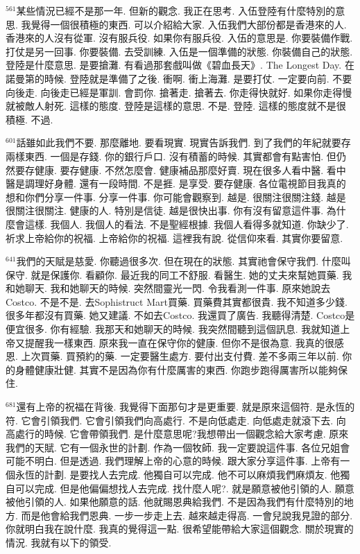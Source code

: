 \documentclass{book}
\begin{document}
$^{561}$某些情況已經不是那一年.
但新的觀念.
我正在思考.
入伍登陸有什麼特別的意思.
我覺得一個很積極的東西.
可以介紹給大家.
入伍我們大部份都是香港來的人.
香港來的人沒有從軍.
沒有服兵役.
如果你有服兵役.
入伍的意思是.
你要裝備作戰.
打仗是另一回事.
你要裝備.
去受訓練.
入伍是一個準備的狀態.
你裝備自己的狀態.
登陸是什麼意思.
是要搶灘.
有看過那套戲叫做《碧血長天》.
The Longest Day.
在諾曼第的時候.
登陸就是準備了之後.
衝啊.
衝上海灘.
是要打仗.
一定要向前.
不要向後走.
向後走已經是軍訓.
會罰你.
搶著走.
搶著去.
你走得快就好.
如果你走得慢就被敵人射死.
這樣的態度.
登陸是這樣的意思.
不是.
登陸.
這樣的態度就不是很積極.
不過.

$^{601}$話雖如此我們不要.
那麼離地.
要看現實.
現實告訴我們.
到了我們的年紀就要存兩樣東西.
一個是存錢.
你的銀行戶口.
沒有積蓄的時候.
其實都會有點害怕.
但仍然要存健康.
要存健康.
不然怎麼會.
健康補品那麼好賣.
現在很多人看中醫.
看中醫是調理好身體.
還有一段時間.
不是捱.
是享受.
要存健康.
各位電視節目我真的想和你們分享一件事.
分享一件事.
你可能會觀察到.
越是.
很關注很關注錢.
越是很關注很關注.
健康的人.
特別是信徒.
越是很快出事.
你有沒有留意這件事.
為什麼會這樣.
我個人.
我個人的看法.
不是聖經根據.
我個人看得多就知道.
你缺少了.
祈求上帝給你的祝福.
上帝給你的祝福.
這裡我有說.
從信仰來看.
其實你要留意.

$^{641}$我們的天賦是慈愛.
你聽過很多次.
但在現在的狀態.
其實祂會保守我們.
什麼叫保守.
就是保護你.
看顧你.
最近我的同工不舒服.
看醫生.
她的丈夫來幫她買藥.
我和她聊天.
我和她聊天的時候.
突然間靈光一閃.
令我看測一件事.
原來她說去Costco.
不是不是.
去Sophistruct Mart買藥.
買藥費其實都很貴.
我不知道多少錢.
很多年都沒有買藥.
她又建議.
不如去Costco.
我還買了廣告.
我聽得清楚.
Costco是便宜很多.
你有經驗.
我那天和她聊天的時候.
我突然間聽到這個訊息.
我就知道上帝又提醒我一樣東西.
原來我一直在保守你的健康.
但你不是很為意.
我真的很感恩.
上次買藥.
買預約的藥.
一定要醫生處方.
要付出支付費.
差不多兩三年以前.
你的身體健康壯健.
其實不是因為你有什麼厲害的東西.
你跑步跑得厲害所以能夠保住.

$^{681}$還有上帝的祝福在背後.
我覺得下面那句才是更重要.
就是原來這個符.
是永恆的符.
它會引領我們.
它會引領我們向高處行.
不是向低處走.
向低處走就滾下去.
向高處行的時候.
它會帶領我們.
是什麼意思呢?我想帶出一個觀念給大家考慮.
原來我們的天賦.
它有一個永世的計劃.
作為一個牧師.
我一定要說這件事.
各位兄姐會可能不明白.
但是透過.
我們理解上帝的心意的時候.
跟大家分享這件事.
上帝有一個永恆的計劃.
是要找人去完成.
他獨自可以完成.
他不可以麻煩我們麻煩友.
他獨自可以完成.
但是他偏偏想找人去完成.
找什麼人呢?.
就是願意被他引領的人.
願意被他引領的人.
如果他願意的話.
他就賜恩典給我們.
不是因為我們有什麼特別的地方.
而是他會給我們恩典.
一步一步走上去.
越來越走得高.
一會兒說我見證的部分.
你就明白我在說什麼.
我真的覺得這一點.
很希望能帶給大家這個觀念.
關於現實的情況.
我就有以下的領受.
\end{document}
